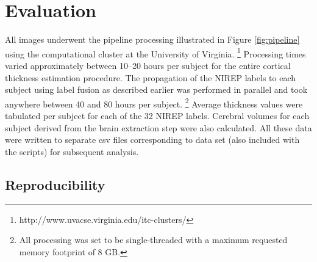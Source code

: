 \section{Evaluation}

All images underwent the pipeline processing illustrated in Figure 
\ref{fig:pipeline} using the computational cluster at the University 
of Virginia.%
\footnote{
http://www.uvacse.virginia.edu/itc-clusters/
}  
Processing times varied approximately between 10--20 hours per subject
for the entire cortical thickness estimation procedure.  The propagation of the
NIREP labels to each subject using label fusion as described earlier
was performed in parallel and took anywhere between 40 and 80 hours per 
subject.%
\footnote{
All processing was set to be single-threaded with a maximum requested memory 
footprint of 8 GB.
}  
Average thickness values were tabulated per subject for each of the
32 NIREP labels.  Cerebral volumes for each subject derived from the brain 
extraction step were also calculated.  All these data were written to separate csv
files corresponding to data set (also included with the scripts) for subsequent 
analysis.

\subsection{Reproducibility}

